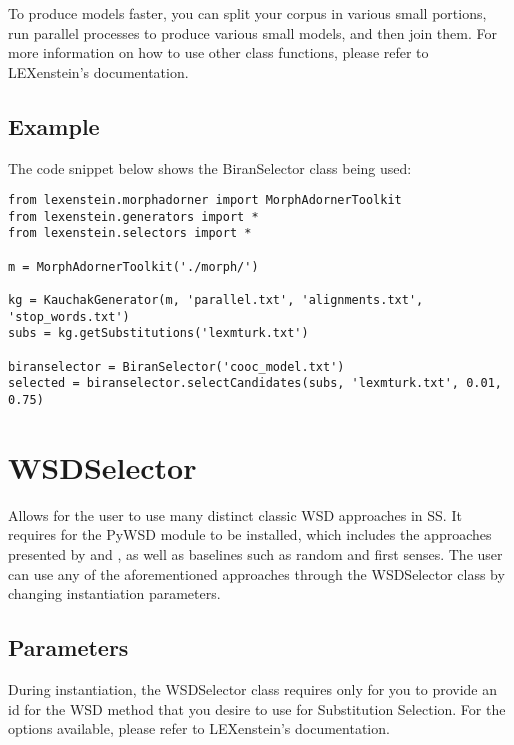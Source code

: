 To produce models faster, you can split your corpus in various small portions, run parallel processes to produce various small models, and then join them.  For more information on how to use other class functions, please refer to LEXenstein's documentation.

\subsection{Example}

The code snippet below shows the BiranSelector class being used:

\begin{lstlisting}
from lexenstein.morphadorner import MorphAdornerToolkit
from lexenstein.generators import *
from lexenstein.selectors import *

m = MorphAdornerToolkit('./morph/')

kg = KauchakGenerator(m, 'parallel.txt', 'alignments.txt', 'stop_words.txt')
subs = kg.getSubstitutions('lexmturk.txt')

biranselector = BiranSelector('cooc_model.txt')
selected = biranselector.selectCandidates(subs, 'lexmturk.txt', 0.01, 0.75)
\end{lstlisting}














\section{WSDSelector}

Allows for the user to use many distinct classic WSD approaches in SS. It requires for the PyWSD \cite{pywsd} module to be installed, which includes the approaches presented by \cite{lesk} and \cite{wupalmer}, as well as baselines such as random and first senses. The user can use any of the aforementioned approaches through the WSDSelector class by changing instantiation parameters.

\subsection{Parameters}

During instantiation, the WSDSelector class requires only for you to provide an id for the WSD method that you desire to use for Substitution Selection. For the options available, please refer to LEXenstein's documentation.

